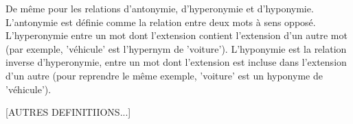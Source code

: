 De même pour les relations d'antonymie, d'hyperonymie et d'hyponymie. 
L'antonymie est définie comme la relation entre deux mots à sens opposé. 
L'hyperonymie entre un mot dont l'extension contient l'extension d'un autre mot 
(par exemple, 'véhicule' est l'hypernym de 'voiture'). L'hyponymie est la 
relation inverse d'hyperonymie, entre un mot dont l'extension est incluse dans 
l'extension d'un autre (pour reprendre le même exemple, 'voiture' est un 
hyponyme de 'véhicule').

[AUTRES DEFINITIIONS...]
